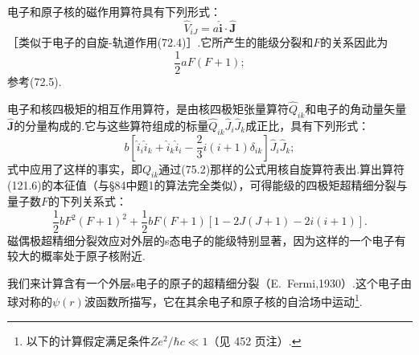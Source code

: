 电子和原子核的磁作用算符具有下列形式：
\begin{equation}
  \hat{V}_{iJ}=a\hat{\boldsymbol{i}}\cdot\hat{\boldsymbol{J}}
\end{equation}
［类似于电子的自旋-轨道作用(72.4)］.它所产生的能级分裂和$F$的关系因此为
\begin{equation}
  \frac{1}{2}aF(F+1);
\end{equation}
参考(72.5).

电子和核四极矩的相互作用算符，是由核四极矩张量算符$\hat{Q}_{ik}$和电子的角动量矢量$\hat{\boldsymbol{J}}$的分量构成的.它与这些算符组成的标量$\hat{Q}_{ik}\hat{J}_i\hat{J}_k$成正比，具有下列形式：
\begin{equation}
  b\left[\hat{i}_i\hat{i}_k+\hat{i}_k\hat{i}_i
  -\frac{2}{3}i(i+1)\delta_{ik}\right]\hat{J}_i\hat{J}_k;
\end{equation}
式中应用了这样的事实，即$Q_{ik}$通过(75.2)那样的公式用核自旋算符表出.算出算符(121.6)的本征值（与§84中题1的算法完全类似），可得能级的四极矩超精细分裂与量子数$F$的下列关系式：
\begin{equation}
  \frac{1}{2}bF^2(F+1)^2
  +\frac{1}{2}bF(F+1)\left[1-2J(J+1)-2i(i+1)\right].
\end{equation}
磁偶极超精细分裂效应对外层的s态电子的能级特别显著，因为这样的一个电子有较大的概率处于原子核附近.

我们来计算含有一个外层s电子的原子的超精细分裂（E.~Fermi,1930）.这个电子由球对称的$\psi(r)$波函数所描写，它在其余电子和原子核的自洽场中运动\footnote{以下的计算假定满足条件$Ze^2/\hbar c\ll1$（见 452 页注{}）.}.

